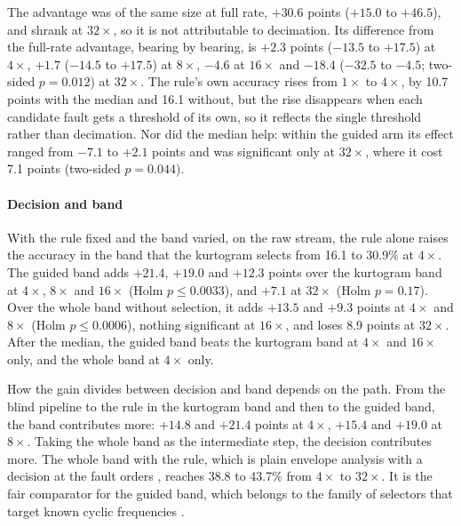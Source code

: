 The advantage was of the same size at full rate, $+30.6$ points ($+15.0$ to $+46.5$), and shrank at
$32\times$, so it is not attributable to decimation. Its difference from the full-rate advantage,
bearing by bearing, is $+2.3$ points ($-13.5$ to $+17.5$) at $4\times$, $+1.7$ ($-14.5$ to $+17.5$)
at $8\times$, $-4.6$ at $16\times$ and $-18.4$ ($-32.5$ to $-4.5$; two-sided $p = 0.012$) at
$32\times$. The rule's own accuracy rises from $1\times$ to $4\times$, by 10.7 points with the
median and 16.1 without, but the rise disappears when each candidate fault gets a threshold of its
own, so it reflects the single threshold rather than decimation. Nor did the median help: within the
guided arm its effect ranged from $-7.1$ to $+2.1$ points and was significant only at $32\times$,
where it cost 7.1 points (two-sided $p = 0.044$).

\paragraph{Decision and band} With the rule fixed and the band varied, on the raw stream, the rule
alone raises the accuracy in the band that the kurtogram selects from 16.1 to 30.9\% at $4\times$.
The guided band adds $+21.4$, $+19.0$ and $+12.3$ points over the kurtogram band at $4\times$,
$8\times$ and $16\times$ (Holm $p \le 0.0033$), and $+7.1$ at $32\times$ (Holm $p = 0.17$). Over the
whole band without selection, it adds $+13.5$ and $+9.3$ points at $4\times$ and $8\times$ (Holm
$p \le 0.0006$), nothing significant at $16\times$, and loses 8.9 points at $32\times$. After the
median, the guided band beats the kurtogram band at $4\times$ and $16\times$ only, and the whole
band at $4\times$ only.

How the gain divides between decision and band depends on the path. From the blind pipeline to the
rule in the kurtogram band and then to the guided band, the band contributes more: $+14.8$ and
$+21.4$ points at $4\times$, $+15.4$ and $+19.0$ at $8\times$. Taking the whole band as the
intermediate step, the decision contributes more. The whole band with the rule, which is plain
envelope analysis with a decision at the fault orders \citep{randall2011bearing}, reaches 38.8 to
43.7\% from $4\times$ to $32\times$. It is the fair comparator for the guided band, which belongs to
the family of selectors that target known cyclic frequencies
\citep{smith2019demodband,mauricio2020iesfogram,schmidt2020ifbigram}.

